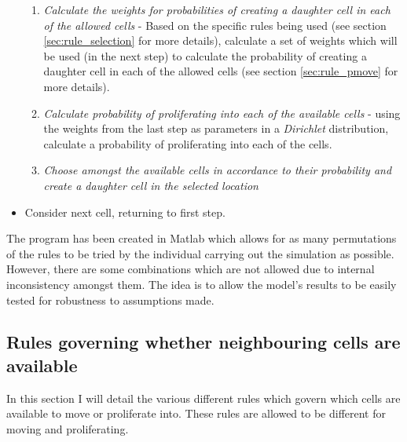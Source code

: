 \documentclass[pdftex,10pt,a4paper]{article}
\begin{document}
\begin{itemize}
\begin{enumerate}
\item \textit{Calculate the weights for probabilities of creating a daughter cell in each of the allowed cells} - Based on the specific rules being used (see section \ref{sec:rule_selection} for more details), calculate a set of weights which will be used (in the next step) to calculate the probability of creating a daughter cell in each of the allowed cells (see section \ref{sec:rule_pmove} for more details).
\item \textit{Calculate probability of proliferating into each of the available cells} - using the weights from the last step as parameters in a \textit{Dirichlet} distribution, calculate a probability of proliferating into each of the cells. 
\item \textit{Choose amongst the available cells in accordance to their probability and create a daughter cell in the selected location}
\end{enumerate} 
\item Consider next cell, returning to first step.
\end{itemize}

The program has been created in Matlab which allows for as many permutations of the rules to be tried by the individual carrying out the simulation as possible. However, there are some combinations which are not allowed due to internal inconsistency amongst them. The idea is to allow the model's results to be easily tested for robustness to assumptions made.

\subsection{Rules governing whether neighbouring cells are available}\label{sec:rule_available}
In this section I will detail the various different rules which govern which cells are available to move or proliferate into. These rules are allowed to be different for moving and proliferating.
\end{document}
